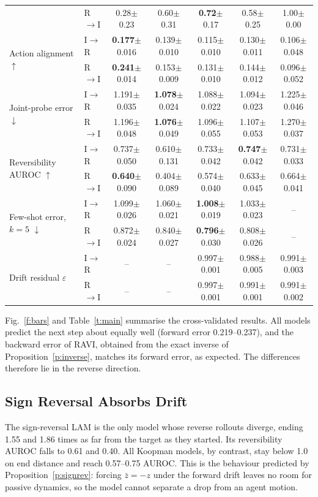 \documentclass{jcse}
\newcommand{\method}{RAVI}
\newcommand{\zb}{\bar{z}}
\begin{document}
\begin{table}
\begin{tabular}{llccccc}
		 & R$\to$I & 0.28$\pm$0.23 & 0.60$\pm$0.31 & \textbf{0.72}$\pm$0.17 & 0.58$\pm$0.25 & 1.00$\pm$0.00 \\
		\multirow{2}{*}{Action alignment $\uparrow$} & I$\to$R & \textbf{0.177}$\pm$0.016 & 0.139$\pm$0.010 & 0.115$\pm$0.010 & 0.130$\pm$0.011 & 0.106$\pm$0.048 \\
		 & R$\to$I & \textbf{0.241}$\pm$0.014 & 0.153$\pm$0.009 & 0.131$\pm$0.010 & 0.144$\pm$0.012 & 0.096$\pm$0.052 \\
		\multirow{2}{*}{Joint-probe error $\downarrow$} & I$\to$R & 1.191$\pm$0.035 & \textbf{1.078}$\pm$0.024 & 1.088$\pm$0.022 & 1.094$\pm$0.023 & 1.225$\pm$0.046 \\
		 & R$\to$I & 1.196$\pm$0.048 & \textbf{1.076}$\pm$0.049 & 1.096$\pm$0.055 & 1.107$\pm$0.053 & 1.270$\pm$0.037 \\
		\multirow{2}{*}{Reversibility AUROC $\uparrow$} & I$\to$R & 0.737$\pm$0.050 & 0.610$\pm$0.131 & 0.733$\pm$0.042 & \textbf{0.747}$\pm$0.042 & 0.731$\pm$0.033 \\
		 & R$\to$I & \textbf{0.640}$\pm$0.090 & 0.404$\pm$0.089 & 0.574$\pm$0.040 & 0.633$\pm$0.045 & 0.664$\pm$0.041 \\
		\multirow{2}{*}{Few-shot error, $k=5$ $\downarrow$} & I$\to$R & 1.099$\pm$0.026 & 1.060$\pm$0.021 & \textbf{1.008}$\pm$0.019 & 1.033$\pm$0.023 & -- \\
		 & R$\to$I & 0.872$\pm$0.024 & 0.840$\pm$0.027 & \textbf{0.796}$\pm$0.030 & 0.808$\pm$0.026 & -- \\
		\multirow{2}{*}{Drift residual $\varepsilon$} & I$\to$R & -- & -- & 0.997$\pm$0.001 & 0.988$\pm$0.005 & 0.991$\pm$0.003 \\
		 & R$\to$I & -- & -- & 0.997$\pm$0.001 & 0.991$\pm$0.001 & 0.991$\pm$0.002 \\
		\bottomrule
	\end{tabular}
\end{table}

Fig.~\ref{f:bars} and Table~\ref{t:main} summarise the cross-validated results.
All models predict the next step about equally well (forward error 0.219--0.237), and the backward error of {\method}, obtained from the exact inverse of Proposition~\ref{p:inverse}, matches its forward error, as expected.
The differences therefore lie in the reverse direction.

\subsection{Sign Reversal Absorbs Drift}
The sign-reversal LAM is the only model whose reverse rollouts diverge, ending 1.55 and 1.86 times as far from the target as they started.
Its reversibility AUROC falls to 0.61 and 0.40.
All Koopman models, by contrast, stay below 1.0 on end distance and reach 0.57--0.75 AUROC.
This is the behaviour predicted by Proposition~\ref{p:signrev}: forcing $\zb=-z$ under the forward drift leaves no room for passive dynamics, so the model cannot separate a drop from an agent motion.
\end{document}
